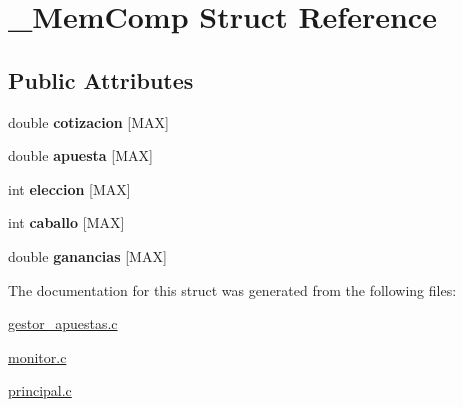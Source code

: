 \hypertarget{struct__MemComp}{}\section{\+\_\+\+Mem\+Comp Struct Reference}
\label{struct__MemComp}
\subsection*{Public Attributes}
\begin{DoxyCompactItemize}
\item 
double {\bfseries cotizacion} \mbox{[}M\+AX\mbox{]}\hypertarget{struct__MemComp_a3f83eaea44f7e9c914671b0b38a34fef}{}\label{struct__MemComp_a3f83eaea44f7e9c914671b0b38a34fef}

\item 
double {\bfseries apuesta} \mbox{[}M\+AX\mbox{]}\hypertarget{struct__MemComp_a97ebc6e2ae584de2c7078308849850a9}{}\label{struct__MemComp_a97ebc6e2ae584de2c7078308849850a9}

\item 
int {\bfseries eleccion} \mbox{[}M\+AX\mbox{]}\hypertarget{struct__MemComp_aa9412d00e6f4b7b1d8e4d4679beda094}{}\label{struct__MemComp_aa9412d00e6f4b7b1d8e4d4679beda094}

\item 
int {\bfseries caballo} \mbox{[}M\+AX\mbox{]}\hypertarget{struct__MemComp_a41333714f93a447e8ca1fb0e167a8814}{}\label{struct__MemComp_a41333714f93a447e8ca1fb0e167a8814}

\item 
double {\bfseries ganancias} \mbox{[}M\+AX\mbox{]}\hypertarget{struct__MemComp_acd9c53358994ce0b61f136eea11f6bcb}{}\label{struct__MemComp_acd9c53358994ce0b61f136eea11f6bcb}

\end{DoxyCompactItemize}


The documentation for this struct was generated from the following files\+:\begin{DoxyCompactItemize}
\item 
\hyperlink{gestor__apuestas_8c}{gestor\+\_\+apuestas.\+c}\item 
\hyperlink{monitor_8c}{monitor.\+c}\item 
\hyperlink{principal_8c}{principal.\+c}\end{DoxyCompactItemize}
